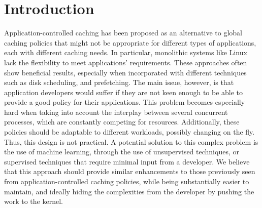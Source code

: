 \section{Introduction}

Application-controlled caching has been proposed as an alternative to global caching policies that might not be appropriate for different types of applications, each with different caching needs. In particular, monolithic systems like Linux lack the flexibility to meet applications' requirements. These approaches often show beneficial results, especially when incorporated with different techniques such as disk scheduling, and prefetching. The main issue, however, is that application developers would suffer if they are not keen enough to be able to provide a good policy for their applications. This problem becomes especially hard when taking into account the interplay between several concurrent processes, which are constantly competing for resources. Additionally, these policies should be adaptable to different workloads, possibly changing on the fly. Thus, this design is not practical. A potential solution to this complex problem is the use of machine learning, through the use of unsupervised techniques, or supervised techniques that require minimal input from a developer. We believe that this approach should provide similar enhancements to those previously seen from application-controlled caching policies, while being substantially easier to maintain, and ideally hiding the complexities from the developer by pushing the work to the kernel. 
